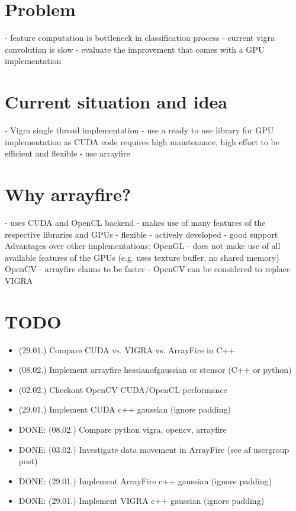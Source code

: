 \documentclass[12pt,a4paper]{article}
\begin{document}
\setlength{\parindent}{0pt}


\section{Problem}
- feature computation is bottleneck in classification process
- current vigra convolution is slow
- evaluate the improvement that comes with a GPU implementation

\section{Current situation and idea}
- Vigra single thread implementation
- use a ready to use library for GPU implementation as CUDA code requires high maintenance, high effort to be efficient and flexible
- use arrayfire

\section{Why arrayfire?}
- uses CUDA and OpenCL backend
  - makes use of many features of the respective libraries and GPUs
- flexible
- actively developed
- good support
Advantages over other implementations:
OpenGL
- does not make use of all available features of the GPUs (e.g. uses texture buffer, no shared memory)
OpenCV
- arrayfire claims to be faster
- OpenCV can be considered to replace VIGRA

\section{TODO}
  \begin{itemize}
    \item (29.01.) Compare CUDA vs. VIGRA vs. ArrayFire in C++
    \item (08.02.) Implement arrayfire hessianofgaussian or stensor (C++ or python)
    \item (02.02.) Checkout OpenCV CUDA/OpenCL performance
    \item (29.01.) Implement CUDA c++ gaussian (ignore padding)
    \item DONE: (08.02.) Compare python vigra, opencv, arrayfire
    \item DONE: (03.02.) Investigate data movement in ArrayFire (see af usergroup post)
    \item DONE: (29.01.) Implement ArrayFire c++ gaussian (ignore padding)
    \item DONE: (29.01.) Implement VIGRA c++ gaussian (ignore padding)
  \end{itemize}
\end{document}
